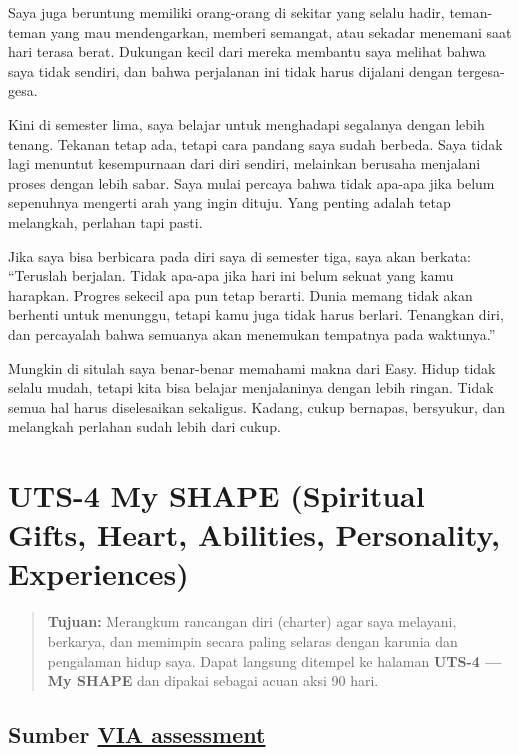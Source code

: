 \documentclass[
  letterpaper,
  DIV=11,
  numbers=noendperiod]{scrreprt}
\begin{document}
Saya juga beruntung memiliki orang-orang di sekitar yang selalu hadir,
teman-teman yang mau mendengarkan, memberi semangat, atau sekadar
menemani saat hari terasa berat. Dukungan kecil dari mereka membantu
saya melihat bahwa saya tidak sendiri, dan bahwa perjalanan ini tidak
harus dijalani dengan tergesa-gesa.

Kini di semester lima, saya belajar untuk menghadapi segalanya dengan
lebih tenang. Tekanan tetap ada, tetapi cara pandang saya sudah berbeda.
Saya tidak lagi menuntut kesempurnaan dari diri sendiri, melainkan
berusaha menjalani proses dengan lebih sabar. Saya mulai percaya bahwa
tidak apa-apa jika belum sepenuhnya mengerti arah yang ingin dituju.
Yang penting adalah tetap melangkah, perlahan tapi pasti.

Jika saya bisa berbicara pada diri saya di semester tiga, saya akan
berkata: ``Teruslah berjalan. Tidak apa-apa jika hari ini belum sekuat
yang kamu harapkan. Progres sekecil apa pun tetap berarti. Dunia memang
tidak akan berhenti untuk menunggu, tetapi kamu juga tidak harus
berlari. Tenangkan diri, dan percayalah bahwa semuanya akan menemukan
tempatnya pada waktunya.''

Mungkin di situlah saya benar-benar memahami makna dari Easy. Hidup
tidak selalu mudah, tetapi kita bisa belajar menjalaninya dengan lebih
ringan. Tidak semua hal harus diselesaikan sekaligus. Kadang, cukup
bernapas, bersyukur, dan melangkah perlahan sudah lebih dari cukup.


\chapter{UTS-4 My SHAPE (Spiritual Gifts, Heart, Abilities, Personality,
Experiences)}\label{uts-4-my-shape-spiritual-gifts-heart-abilities-personality-experiences}

\begin{quote}
\textbf{Tujuan:} Merangkum rancangan diri (charter) agar saya melayani,
berkarya, dan memimpin secara paling selaras dengan karunia dan
pengalaman hidup saya. Dapat langsung ditempel ke halaman \textbf{UTS-4
--- My SHAPE} dan dipakai sebagai acuan aksi 90 hari.
\end{quote}

\section{\texorpdfstring{Sumber
\href{StrengthsProfile-Armein-Langi.pdf}{VIA
assessment}}{Sumber VIA assessment}}\label{sumber-via-assessment}
\end{document}
